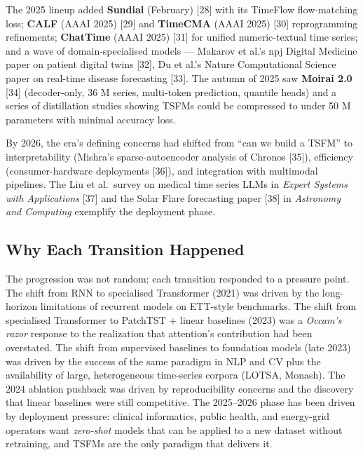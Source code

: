 The 2025 lineup added \textbf{Sundial} (February) {[}28{]} with its TimeFlow flow-matching loss; \textbf{CALF} (AAAI 2025) {[}29{]} and \textbf{TimeCMA} (AAAI 2025) {[}30{]} reprogramming refinements; \textbf{ChatTime} (AAAI 2025) {[}31{]} for unified numeric-textual time series; and a wave of domain-specialised models --- Makarov et al.'s npj Digital Medicine paper on patient digital twins {[}32{]}, Du et al.'s Nature Computational Science paper on real-time disease forecasting {[}33{]}. The autumn of 2025 saw \textbf{Moirai 2.0} {[}34{]} (decoder-only, 36 M series, multi-token prediction, quantile heads) and a series of distillation studies showing TSFMs could be compressed to under 50 M parameters with minimal accuracy loss.

By 2026, the era's defining concerns had shifted from ``can we build a TSFM'' to interpretability (Mishra's sparse-autoencoder analysis of Chronos {[}35{]}), efficiency (consumer-hardware deployments {[}36{]}), and integration with multimodal pipelines. The Liu et al.~survey on medical time series LLMs in \emph{Expert Systems with Applications} {[}37{]} and the Solar Flare forecasting paper {[}38{]} in \emph{Astronomy and Computing} exemplify the deployment phase.

\subsection{Why Each Transition Happened}\label{why-each-transition-happened}

The progression was not random; each transition responded to a pressure point. The shift from RNN to specialised Transformer (2021) was driven by the long-horizon limitations of recurrent models on ETT-style benchmarks. The shift from specialised Transformer to PatchTST + linear baselines (2023) was a \emph{Occam's razor} response to the realization that attention's contribution had been overstated. The shift from supervised baselines to foundation models (late 2023) was driven by the success of the same paradigm in NLP and CV plus the availability of large, heterogeneous time-series corpora (LOTSA, Monash). The 2024 ablation pushback was driven by reproducibility concerns and the discovery that linear baselines were still competitive. The 2025--2026 phase has been driven by deployment pressure: clinical informatics, public health, and energy-grid operators want \emph{zero-shot} models that can be applied to a new dataset without retraining, and TSFMs are the only paradigm that delivers it.

